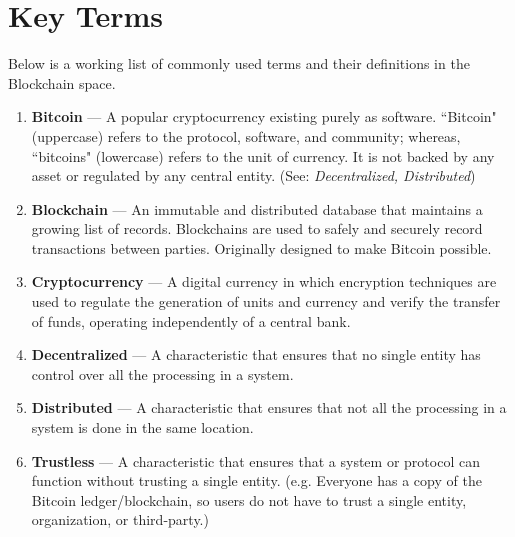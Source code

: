 \documentclass[11pt]{article}
\begin{document}
    \section*{Key Terms}
    \noindent Below is a working list of commonly used terms and their definitions in the Blockchain space.
    \begin{enumerate}
        \item \textbf{Bitcoin} --- A popular cryptocurrency existing purely as software. ``Bitcoin" (uppercase) refers to the protocol, software, and community; whereas, ``bitcoins" (lowercase) refers to the unit of currency. It is not backed by any asset or regulated by any central entity. (See: \textit{Decentralized, Distributed})
        \item \textbf{Blockchain} --- An immutable and distributed database that maintains a growing list of records. Blockchains are used to safely and securely record transactions between parties. Originally designed to make Bitcoin possible.
        \item \textbf{Cryptocurrency} --- A digital currency in which encryption techniques are used to regulate the generation of units and currency and verify the transfer of funds, operating independently of a central bank.
        \item \textbf{Decentralized} --- A characteristic that ensures that no single entity has control over all the processing in a system.
        \item \textbf{Distributed} --- A characteristic that ensures that not all the processing in a system is done in the same location.
        \item \textbf{Trustless} --- A characteristic that ensures that a system or protocol can function without trusting a single entity. (e.g. Everyone has a copy of the Bitcoin ledger/blockchain, so users do not have to trust a single entity, organization, or third-party.)
        
    \end{enumerate}
\end{document}

